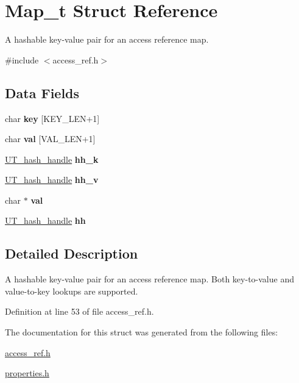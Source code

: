 \hypertarget{struct_map__t}{
\section{Map\_\-t Struct Reference}
\label{struct_map__t}
}


A hashable key-\/value pair for an access reference map.  




{\ttfamily \#include $<$access\_\-ref.h$>$}

\subsection*{Data Fields}
\begin{DoxyCompactItemize}
\item 
\hypertarget{struct_map__t_aa7b10466fba0c627d64d74ba2a00bfca}{
char {\bfseries key} \mbox{[}KEY\_\-LEN+1\mbox{]}}
\label{struct_map__t_aa7b10466fba0c627d64d74ba2a00bfca}

\item 
\hypertarget{struct_map__t_ae67f5846919f96711f5352bd56b7b0b1}{
char {\bfseries val} \mbox{[}VAL\_\-LEN+1\mbox{]}}
\label{struct_map__t_ae67f5846919f96711f5352bd56b7b0b1}

\item 
\hypertarget{struct_map__t_a967d8ba74fb938da767098507c06b8d0}{
\hyperlink{struct_u_t__hash__handle}{UT\_\-hash\_\-handle} {\bfseries hh\_\-k}}
\label{struct_map__t_a967d8ba74fb938da767098507c06b8d0}

\item 
\hypertarget{struct_map__t_a845409cdbe32103c84088954804ec170}{
\hyperlink{struct_u_t__hash__handle}{UT\_\-hash\_\-handle} {\bfseries hh\_\-v}}
\label{struct_map__t_a845409cdbe32103c84088954804ec170}

\item 
\hypertarget{struct_map__t_a97a7600b3f2cc360983f95de0d615962}{
char $\ast$ {\bfseries val}}
\label{struct_map__t_a97a7600b3f2cc360983f95de0d615962}

\item 
\hypertarget{struct_map__t_a3a450be49dcdd0da21ac9bb29d0304a2}{
\hyperlink{struct_u_t__hash__handle}{UT\_\-hash\_\-handle} {\bfseries hh}}
\label{struct_map__t_a3a450be49dcdd0da21ac9bb29d0304a2}

\end{DoxyCompactItemize}


\subsection{Detailed Description}
A hashable key-\/value pair for an access reference map. Both key-\/to-\/value and value-\/to-\/key lookups are supported. 

Definition at line 53 of file access\_\-ref.h.



The documentation for this struct was generated from the following files:\begin{DoxyCompactItemize}
\item 
\hyperlink{access__ref_8h}{access\_\-ref.h}\item 
\hyperlink{properties_8h}{properties.h}\end{DoxyCompactItemize}
